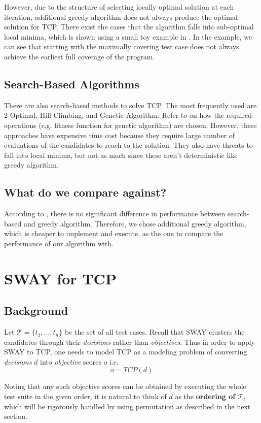 \documentclass[10pt,journal,compsoc]{IEEEtran}
\begin{document}
	However, due to the structure of selecting locally optimal solution at each iteration, additional greedy algorithm does not always produce the optimal solution for TCP. There exist the cases that the algorithm falls into sub-optimal local minima, which is shown using a small toy example in \cite{LHH07}. In the example, we can see that starting with the maximally covering test case does not always achieve the earliest full coverage of the program.
	
	\subsection{Search-Based Algorithms}
	There are also search-based methods to solve TCP. The most frequently used are 2-Optimal, Hill Climbing, and Genetic Algorithm.
	Refer to \cite{LHH07} on how the required operations (e.g. fitness function for genetic algorithm) are chosen.
	However, these approaches have expensive time cost because they require large number of evaluations of the candidates to reach to the solution. They also have threats to fall into local minima, but not as much since these aren't deterministic like greedy algorithm.
	
	\subsection{What do we compare against?}
	According to \cite{LHH07}, there is no significant difference in performance between search-based and greedy algorithm. Therefore, we chose additional greedy algorithm, which is cheaper to implement and execute, as the one to compare the performance of our algorithm with.
	
	
	\section{SWAY for TCP}
	
	\subsection{Background}
	Let $\mathcal{T} = \{t_1, \dots, t_n\}$ be the set of all test cases.
	Recall that SWAY clusters the candidates through their {\it decisions} rather than {\it objectives}.
	Thus in order to apply SWAY to TCP, one needs to model TCP as a modeling problem of converting {\it decisions} $d$ into {\it objective} scores $o$ i.e.
	\[ o = TCP(d) \]
	
	Noting that any such objective scores can be obtained by executing the whole test suite in the given order, it is natural to think of $d$ as the {\bf ordering of $\mathcal{T}$}, which will be rigorously handled by using permutation as described in the next section.
	
\end{document}
